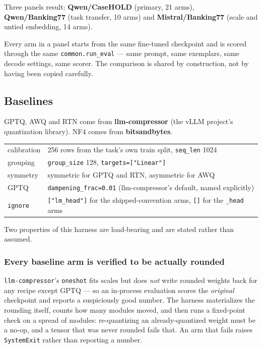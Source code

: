 \documentclass[11pt]{article}
\newcommand{\code}[1]{\texttt{#1}}
\begin{document}
Three panels result: \textbf{Qwen/CaseHOLD} (primary, 21 arms), \textbf{Qwen/Banking77} (task
transfer, 10 arms) and \textbf{Mistral/Banking77} (scale and untied embedding, 14 arms).

Every arm in a panel starts from the same fine-tuned checkpoint and is scored through the same
\code{common.run\_eval} --- same prompt, same exemplars, same decode settings, same scorer. The
comparison is shared by construction, not by having been copied carefully.

\subsection{Baselines}

GPTQ, AWQ and RTN come from \textbf{llm-compressor} (the vLLM project's quantization library).
NF4 comes from \textbf{bitsandbytes}.

\begin{center}\small
\begin{tabular}{@{}ll@{}}
\toprule
calibration & 256 rows from the task's own train split, \code{seq\_len} 1024 \\
grouping & \code{group\_size} 128, \code{targets=["Linear"]} \\
symmetry & symmetric for GPTQ and RTN, asymmetric for AWQ \\
GPTQ & \code{dampening\_frac=0.01} (llm-compressor's default, named explicitly) \\
\code{ignore} & \code{["lm\_head"]} for the shipped-convention arms, \code{[]} for the \code{\_head} arms \\
\bottomrule
\end{tabular}
\end{center}

Two properties of this harness are load-bearing and are stated rather than assumed.

\subsubsection{Every baseline arm is verified to be actually rounded}

\code{llm-compressor}'s \code{oneshot} fits scales but does \emph{not} write rounded weights back
for any recipe except GPTQ --- so an in-process evaluation scores the \emph{original} checkpoint
and reports a suspiciously good number. The harness materializes the rounding itself, counts how
many modules moved, and then runs a fixed-point check on a spread of modules: re-quantizing an
already-quantized weight must be a no-op, and a tensor that was never rounded fails that. An arm
that fails raises \code{SystemExit} rather than reporting a number.
\end{document}
